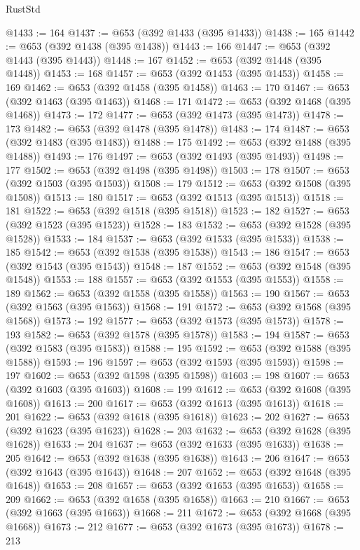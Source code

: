 \begin{lexlean}{RustStd}
\begin{coremodule}
{\begin{coremodule}
{{{{{{{{{{{{@1433 := 164
@1437 := @653 (@392 @1433 (@395 @1433))
@1438 := 165
@1442 := @653 (@392 @1438 (@395 @1438))
@1443 := 166
@1447 := @653 (@392 @1443 (@395 @1443))
@1448 := 167
@1452 := @653 (@392 @1448 (@395 @1448))
@1453 := 168
@1457 := @653 (@392 @1453 (@395 @1453))
@1458 := 169
@1462 := @653 (@392 @1458 (@395 @1458))
@1463 := 170
@1467 := @653 (@392 @1463 (@395 @1463))
@1468 := 171
@1472 := @653 (@392 @1468 (@395 @1468))
@1473 := 172
@1477 := @653 (@392 @1473 (@395 @1473))
@1478 := 173
@1482 := @653 (@392 @1478 (@395 @1478))
@1483 := 174
@1487 := @653 (@392 @1483 (@395 @1483))
@1488 := 175
@1492 := @653 (@392 @1488 (@395 @1488))
@1493 := 176
@1497 := @653 (@392 @1493 (@395 @1493))
@1498 := 177
@1502 := @653 (@392 @1498 (@395 @1498))
@1503 := 178
@1507 := @653 (@392 @1503 (@395 @1503))
@1508 := 179
@1512 := @653 (@392 @1508 (@395 @1508))
@1513 := 180
@1517 := @653 (@392 @1513 (@395 @1513))
@1518 := 181
@1522 := @653 (@392 @1518 (@395 @1518))
@1523 := 182
@1527 := @653 (@392 @1523 (@395 @1523))
@1528 := 183
@1532 := @653 (@392 @1528 (@395 @1528))
@1533 := 184
@1537 := @653 (@392 @1533 (@395 @1533))
@1538 := 185
@1542 := @653 (@392 @1538 (@395 @1538))
@1543 := 186
@1547 := @653 (@392 @1543 (@395 @1543))
@1548 := 187
@1552 := @653 (@392 @1548 (@395 @1548))
@1553 := 188
@1557 := @653 (@392 @1553 (@395 @1553))
@1558 := 189
@1562 := @653 (@392 @1558 (@395 @1558))
@1563 := 190
@1567 := @653 (@392 @1563 (@395 @1563))
@1568 := 191
@1572 := @653 (@392 @1568 (@395 @1568))
@1573 := 192
@1577 := @653 (@392 @1573 (@395 @1573))
@1578 := 193
@1582 := @653 (@392 @1578 (@395 @1578))
@1583 := 194
@1587 := @653 (@392 @1583 (@395 @1583))
@1588 := 195
@1592 := @653 (@392 @1588 (@395 @1588))
@1593 := 196
@1597 := @653 (@392 @1593 (@395 @1593))
@1598 := 197
@1602 := @653 (@392 @1598 (@395 @1598))
@1603 := 198
@1607 := @653 (@392 @1603 (@395 @1603))
@1608 := 199
@1612 := @653 (@392 @1608 (@395 @1608))
@1613 := 200
@1617 := @653 (@392 @1613 (@395 @1613))
@1618 := 201
@1622 := @653 (@392 @1618 (@395 @1618))
@1623 := 202
@1627 := @653 (@392 @1623 (@395 @1623))
@1628 := 203
@1632 := @653 (@392 @1628 (@395 @1628))
@1633 := 204
@1637 := @653 (@392 @1633 (@395 @1633))
@1638 := 205
@1642 := @653 (@392 @1638 (@395 @1638))
@1643 := 206
@1647 := @653 (@392 @1643 (@395 @1643))
@1648 := 207
@1652 := @653 (@392 @1648 (@395 @1648))
@1653 := 208
@1657 := @653 (@392 @1653 (@395 @1653))
@1658 := 209
@1662 := @653 (@392 @1658 (@395 @1658))
@1663 := 210
@1667 := @653 (@392 @1663 (@395 @1663))
@1668 := 211
@1672 := @653 (@392 @1668 (@395 @1668))
@1673 := 212
@1677 := @653 (@392 @1673 (@395 @1673))
@1678 := 213
}}}}}}}}}}}}
\end{coremodule}}
\end{coremodule}
\end{lexlean}
